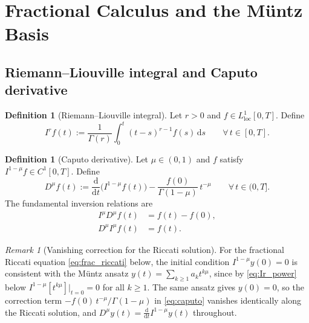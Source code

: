\documentclass[12pt,a4paper]{amsart}
\newcommand{\dd}{\mathrm{d}}
\newcommand{\assign}{:=}
\theoremstyle{plain}
\theoremstyle{definition}
\newtheorem{definition}[theorem]{Definition}
\theoremstyle{remark}
\newtheorem{remark}[theorem]{Remark}
\begin{document}
\section{Fractional Calculus and the M\"untz Basis}\label{sec:prelim}

\subsection{Riemann--Liouville integral and Caputo derivative}

\begin{definition}[Riemann--Liouville integral]\label{def:RL}
Let $r>0$ and $f\in L^1_{\mathrm{loc}}[0,T]$. Define
\begin{equation}\label{eq:RL_int}
  I^r f(t) \assign \frac{1}{\Gamma(r)}\int_0^t (t-s)^{r-1}f(s)\,\dd s
  \qquad \forall\, t\in[0,T].
\end{equation}
\end{definition}

\begin{definition}[Caputo derivative]\label{def:Caputo}
Let $\mu\in(0,1)$ and $f$ satisfy $I^{1-\mu}f\in C^1[0,T]$. Define
\begin{equation}\label{eq:caputo}
  D^{\mu}f(t) \assign \frac{\dd}{\dd t}\!\bigl(I^{1-\mu}f(t)\bigr)
               -\frac{f(0)}{\Gamma(1-\mu)}\,t^{-\mu}
  \qquad \forall\,t\in(0,T].
\end{equation}
The fundamental inversion relations are
\begin{align}
  I^{\mu}D^{\mu}f(t) &= f(t)-f(0), \label{eq:caputo_RL}\\
  D^{\mu}I^{\mu}f(t) &= f(t).       \label{eq:DI}
\end{align}
\end{definition}

\begin{remark}[Vanishing correction for the Riccati solution]\label{rem:correction}
For the fractional Riccati equation \eqref{eq:frac_riccati} below, the initial
condition $I^{1-\mu}y(0)=0$ is consistent with the M\"untz ansatz
$y(t)=\sum_{k\ge 1}a_k t^{k\mu}$, since by \eqref{eq:Ir_power} below
$I^{1-\mu}[t^{k\mu}]\big|_{t=0}=0$ for all $k\ge 1$.
The same ansatz gives $y(0)=0$, so the correction term
$-f(0)\,t^{-\mu}/\Gamma(1-\mu)$ in \eqref{eq:caputo} vanishes identically
along the Riccati solution, and $D^{\mu}y(t)=\frac{\dd}{\dd t}I^{1-\mu}y(t)$
throughout.
\end{remark}
\end{document}
